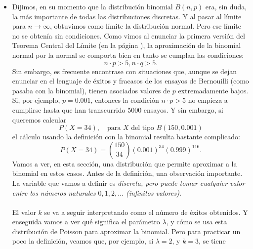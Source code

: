 \begin{itemize}
     \item Dijimos, en su momento que la distribución binomial $B(n,p)$ era, sin duda, la más importante de todas las distribuciones discretas. Y al pasar al límite para $n\to\infty$, obtuvimos como límite la distribución normal. Pero ese límite no se obtenía sin condiciones. Como vimos al enunciar la primera versión del Teorema Central del Límite (en la página \pageref{sec:teoremaCentralLimitePrimeraVersion} ), la aproximación de la binomial normal por la normal se comporta bien en tanto se cumplan las condiciones:
         \[n\cdot p>5, n\cdot q>5.\]
         Sin embargo, es frecuente encontrase con situaciones que, aunque se dejan enunciar en el lenguaje de éxitos y fracasos de los ensayos de Bernouilli (como pasaba con la binomial), tienen asociados valores de $p$ extremadamente bajos. Si, por ejemplo, $p=0.001$, entonces la condición $n\cdot p>5$ no empieza a cumplirse hasta que han transcurrido 5000 ensayos. Y sin embargo, si queremos calcular
         \[P(X=34),\quad\mbox{para $X$ del tipo }B(150,0.001)\]
         el cálculo usando la definición con la binomial resulta bastante complicado:
         \[P(X=34)=\binom{150}{34}\left(0.001\right)^{34}(0.999)^{116}.\]
         Vamos a ver, en esta sección, una distribución que permite aproximar a la binomial en estos casos. Antes de la definición, una observación importante. La variable que vamos a definir es {\em discreta, pero puede tomar cualquier valor entre los números naturales $0,1,2,\ldots$ (infinitos valores).}\\[3mm]
         \\[3mm]
         El valor $k$ se va a seguir interpretando como el número de éxitos obtenidos. Y enseguida vamos a ver qué significa el parámetro $\lambda$, y cómo se usa esta distribución de Poisson para aproximar la binomial. Pero para practicar un poco la definición, veamos que, por ejemplo, si $\lambda=2$, y $k=3$, se tiene

\end{itemize}
